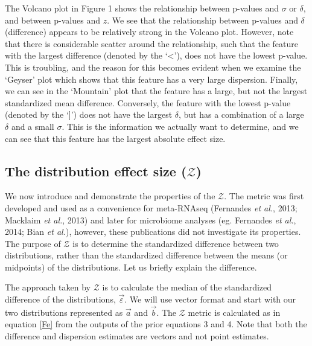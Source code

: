 \documentclass[onecolumn]{article}
\begin{document}
The Volcano plot in Figure 1 shows the relationship between p-values and
\(\sigma\) or \(\delta\), and between p-values and \(z\). We see that
the relationship between p-values and \(\delta\) (difference) appears to
be relatively strong in the Volcano plot. However, note that there is
considerable scatter around the relationship, such that the feature with
the largest difference (denoted by the `\textless{}'), does not have the
lowest p-value. This is troubling, and the reason for this becomes
evident when we examine the `Geyser' plot which shows that this feature
has a very large dispersion. Finally, we can see in the `Mountain' plot
that the feature has a large, but not the largest standardized mean
difference. Conversely, the feature with the lowest p-value (denoted by
the `{]}') does not have the largest \(\delta\), but has a combination
of a large \(\delta\) and a small \(\sigma\). This is the information we
actually want to determine, and we can see that this feature has the
largest absolute effect size.

\hypertarget{the-distribution-effect-size-mathcalz}{%
\subsection{\texorpdfstring{The distribution effect size
(\(\mathcal{Z}\))}{The distribution effect size (\textbackslash{}mathcal\{Z\})}}\label{the-distribution-effect-size-mathcalz}}

We now introduce and demonstrate the properties of the \(\mathcal{Z}\).
The metric was first developed and used as a convenience for meta-RNAseq
(Fernandes \emph{et al.}, 2013; Macklaim \emph{et al.}, 2013) and later
for microbiome analyses (eg. Fernandes \emph{et al.}, 2014; Bian
\emph{et al.}), however, these publications did not investigate its
properties. The purpose of \(\mathcal{Z}\) is to determine the
standardized difference between two distributions, rather than the
standardized difference between the means (or midpoints) of the
distributions. Let us briefly explain the difference.

The approach taken by \(\mathcal{Z}\) is to calculate the median of the
standardized difference of the distributions, \(\vec{\varepsilon}\). We
will use vector format and start with our two distributions represented
as \(\vec{a}\) and \(\vec{b}\). The \(\mathcal{Z}\) metric is calculated
as in equation \ref{Fe} from the outputs of the prior equations 3 and 4.
Note that both the difference and dispersion estimates are vectors and
not point estimates.
\end{document}
